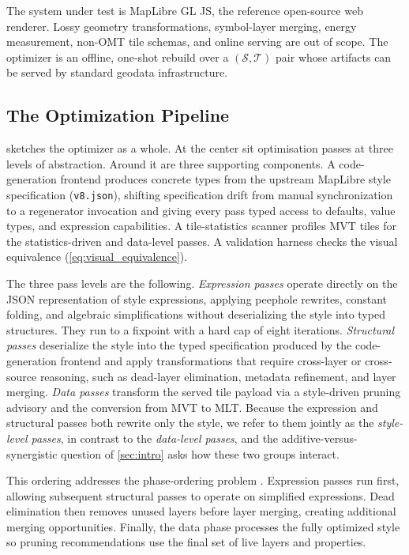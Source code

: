 The system under test is MapLibre GL JS, the reference open-source web renderer.
Lossy geometry transformations, symbol-layer merging, energy measurement, non-\ac{OMT} tile schemas, and online serving are out of scope.
The optimizer is an offline, one-shot rebuild over a $(\mathcal{S}, \mathcal{T})$ pair whose artifacts can be served by standard geodata infrastructure.

\subsection{The Optimization Pipeline}\label{sec:methods:pipeline}

 sketches the optimizer as a whole.
At the center sit optimisation passes at three levels of abstraction.
Around it are three supporting components.
A code-generation frontend produces concrete types from the upstream MapLibre style specification (\texttt{v8.json}), shifting specification drift from manual synchronization to a regenerator invocation and giving every pass typed access to defaults, value types, and expression capabilities.
A tile-statistics scanner profiles \ac{MVT} tiles for the statistics-driven and data-level passes.
A validation harness checks the visual equivalence (\cref{eq:visual_equivalence}).

The three pass levels are the following.
\emph{Expression passes} operate directly on the JSON representation of style expressions, applying peephole rewrites, constant folding, and algebraic simplifications without deserializing the style into typed structures.
They run to a fixpoint with a hard cap of eight iterations.
\emph{Structural passes} deserialize the style into the typed specification produced by the code-generation frontend and apply transformations that require cross-layer or cross-source reasoning, such as dead-layer elimination, metadata refinement, and layer merging.
\emph{Data passes} transform the served tile payload via a style-driven pruning advisory and the conversion from \ac{MVT} to \ac{MLT}.
Because the expression and structural passes both rewrite only the style, we refer to them jointly as the \emph{style-level passes}, in contrast to the \emph{data-level passes}, and the additive-versus-synergistic question of \cref{sec:intro} asks how these two groups interact.

This ordering addresses the phase-ordering problem \citep{clickCombiningAnalysesCombining1995}.
Expression passes run first, allowing subsequent structural passes to operate on simplified expressions.
Dead elimination then removes unused layers before layer merging, creating additional merging opportunities.
Finally, the data phase processes the fully optimized style so pruning recommendations use the final set of live layers and properties.

